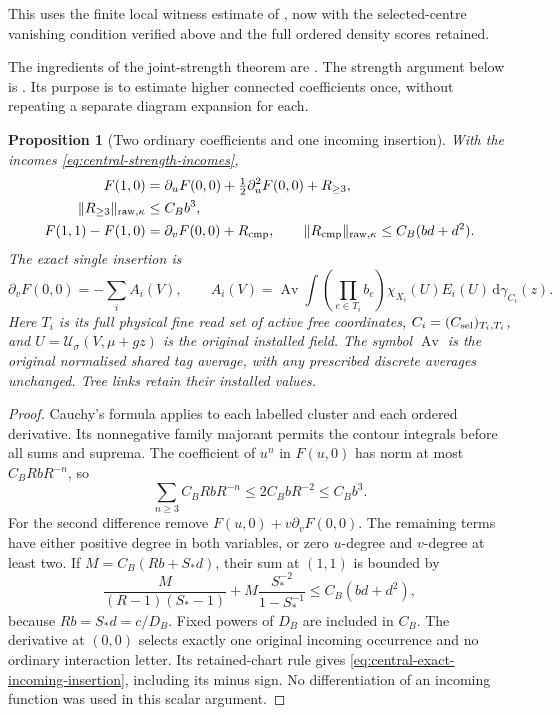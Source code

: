 \documentclass[11pt,reqno]{amsart}
\numberwithin{equation}{section}
\newtheorem{proposition}[theorem]{Proposition}
\theoremstyle{definition}
\theoremstyle{remark}
\newcommand{\dd}{\mathrm d}
\begin{document}
This uses the finite local witness estimate of
\cite[Lemma~28.6, p.~158]{Main}, now with the selected-centre
vanishing condition verified above and the full ordered
density scores retained.

The ingredients of the joint-strength theorem are
\cite[Lemmas~34.1--34.4 and Theorem~34.5, pp.~205--211]{Main}.
The strength argument below is
\cite[Propositions~32.1--32.2, pp.~197--198]{Main}. Its
purpose is to estimate higher connected coefficients once,
without repeating a separate diagram expansion for each.

\begin{proposition}[Two ordinary coefficients and one incoming insertion]
\label{prop:central-strength-coefficients}
With the incomes \eqref{eq:central-strength-incomes},
\begin{align}
 F(1,0)&=\partial_uF(0,0)+\tfrac12\partial_u^2F(0,0)
                                             +R_{\ge3},\notag\\
 \|R_{\ge3}\|_{\mathrm{raw},\kappa}&\le C_Bb^3,
 \label{eq:central-third-remainder}\\
 F(1,1)-F(1,0)&=\partial_vF(0,0)+R_{\rm cmp},\qquad
 \|R_{\rm cmp}\|_{\mathrm{raw},\kappa}
                                             \le C_B(bd+d^2).
 \label{eq:central-incoming-comparison}
\end{align}
The exact single insertion is
\begin{equation}
 \partial_vF(0,0)=-\sum_i A_i(V),\qquad
 A_i(V)=\operatorname{Av}\int
       \left(\prod_{e\in T_i}b_e\right)
                \chi_{X_i}(U)E_i(U)\,\dd\gamma_{C_i}(z).
 \label{eq:central-exact-incoming-insertion}
\end{equation}
Here \(T_i\) is its full physical fine read set of active
free coordinates, \(C_i=(C_{\rm sel})_{T_i,T_i}\), and
\(U=\mathcal U_\sigma(V,\mu+gz)\) is the original installed
field. The symbol \(\operatorname{Av}\) is the original
normalised shared tag average, with any prescribed discrete
averages unchanged. Tree links retain their installed values.
\end{proposition}
\begin{proof}
Cauchy's formula applies to each labelled cluster and each
ordered derivative. Its nonnegative family majorant permits
the contour integrals before all sums and suprema. The
coefficient of \(u^n\) in \(F(u,0)\) has norm at most
\(C_BRbR^{-n}\), so
\[
 \sum_{n\ge3}C_BRbR^{-n}
        \le2C_BbR^{-2}\le C_Bb^3.
\]
For the second difference remove
\(F(u,0)+v\partial_vF(0,0)\). The remaining terms have
either positive degree in both variables, or zero
\(u\)-degree and \(v\)-degree at least two. If
\(M=C_B(Rb+S_*d)\), their sum at \((1,1)\) is bounded by
\[
 \frac{M}{(R-1)(S_*-1)}
             +M\frac{S_*^{-2}}{1-S_*^{-1}}
                              \le C_B(bd+d^2),
\]
because \(Rb=S_*d=c/D_B\). Fixed powers of \(D_B\)
are included in \(C_B\). The derivative at \((0,0)\)
selects exactly one original incoming occurrence and no
ordinary interaction letter. Its retained-chart rule gives
\eqref{eq:central-exact-incoming-insertion}, including its
minus sign. No differentiation of an incoming function
was used in this scalar argument.
\end{proof}
\end{document}
